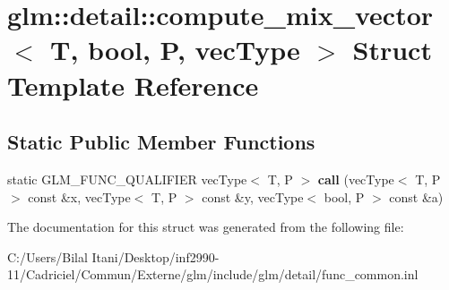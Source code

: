 \hypertarget{structglm_1_1detail_1_1compute__mix__vector_3_01_t_00_01bool_00_01_p_00_01vec_type_01_4}{}\section{glm\+:\+:detail\+:\+:compute\+\_\+mix\+\_\+vector$<$ T, bool, P, vec\+Type $>$ Struct Template Reference}
\label{structglm_1_1detail_1_1compute__mix__vector_3_01_t_00_01bool_00_01_p_00_01vec_type_01_4}
\subsection*{Static Public Member Functions}
\begin{DoxyCompactItemize}
\item 
static G\+L\+M\+\_\+\+F\+U\+N\+C\+\_\+\+Q\+U\+A\+L\+I\+F\+I\+ER vec\+Type$<$ T, P $>$ {\bfseries call} (vec\+Type$<$ T, P $>$ const \&x, vec\+Type$<$ T, P $>$ const \&y, vec\+Type$<$ bool, P $>$ const \&a)\hypertarget{structglm_1_1detail_1_1compute__mix__vector_3_01_t_00_01bool_00_01_p_00_01vec_type_01_4_a8c1f32466902b61e306585f11d903212}{}\label{structglm_1_1detail_1_1compute__mix__vector_3_01_t_00_01bool_00_01_p_00_01vec_type_01_4_a8c1f32466902b61e306585f11d903212}

\end{DoxyCompactItemize}


The documentation for this struct was generated from the following file\+:\begin{DoxyCompactItemize}
\item 
C\+:/\+Users/\+Bilal Itani/\+Desktop/inf2990-\/11/\+Cadriciel/\+Commun/\+Externe/glm/include/glm/detail/func\+\_\+common.\+inl\end{DoxyCompactItemize}
